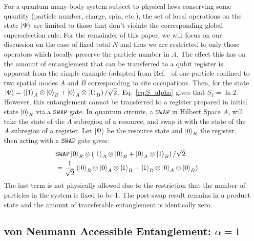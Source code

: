For a quantum many-body system subject to physical laws conserving some quantity (particle number, charge, spin, etc.), the set of local operations on the state $\ket{\Psi}$ are limited to those that don't violate the corresponding global superselection rule.  For the remainder of this paper, we will focus on our discussion on the case of fixed total $N$ and thus we are restricted to only those operators which locally preserve the particle number in $A$.  The effect this has on the amount of entanglement that can be transferred to a qubit register is apparent from the simple example (adapted from Ref.~\cite{Wiseman:2003vn} of one particle confined to two spatial modes $A$ and $B$ corresponding to site occupations.  Then, for the state $\ket{\Psi} = \left(\ket{1}_A \otimes \ket{0}_{B} + \ket{0}_A \otimes \ket{1}_{B} \right)/\sqrt{2}$, Eq.~\eqref{eq:S_alpha} gives that $S_1 = \ln 2$. However, this entanglement cannot be transferred to a register prepared in initial state $\ket{0}_R$ via a $\texttt{SWAP}$ gate. In quantum circuits, a $\texttt{SWAP}$ in Hilbert Space $A$, will take the state of the $A$ subregion of a resource, and swap it with the state of the $A$ subregion of a register. Let $\ket{\Psi}$ be the resource state and $\ket{0}_R$ the register, then acting with a $\texttt{SWAP}$ gate gives:
%
\begin{align*}
    & \texttt{SWAP} \ket{0}_R\otimes\left(\ket{1}_A \otimes
    \ket{0}_{B} + \ket{0}_A \otimes \ket{1}_{B} \right)/\sqrt{2} \\
    &= \frac{1}{\sqrt{2}}\left( \ket{0}_R \otimes \ket{0}_A \otimes
        \ket{1}_{B} + \ket{1}_R \otimes \ket{0}_A \otimes
    \ket{0}_{B} \right)
\end{align*}
The last term is not physically allowed due to the restriction that the number of particles in the system is fixed to be 1. The post-swap result remains in a product state and the amount of transferable entanglement is identically zero.

\subsection{von Neumann Accessible Entanglement: $\alpha = 1$}

